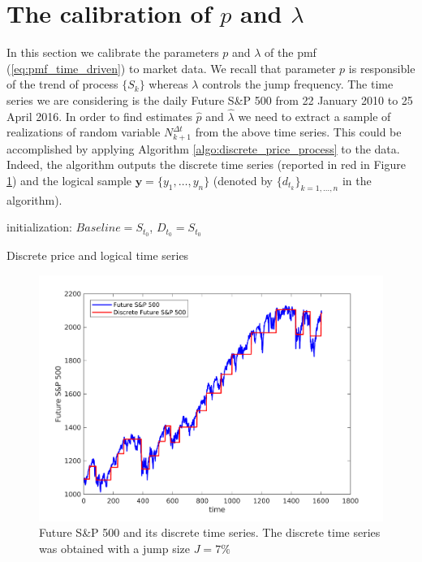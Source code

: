 \section{The calibration of $p$ and $\lambda$}
In this section we calibrate the parameters $p$ and $\lambda$ of the pmf (\ref{eq:pmf_time_driven}) to market data. We recall that parameter $p$ is responsible of the trend of process $\{S_k\}$ whereas $\lambda$ controls the jump frequency. The time series we are considering is the daily Future S\&P 500 from 22 January 2010 to 25 April 2016. In order to find estimates $\widehat{p}$ and $\widehat{\lambda}$ we need to extract a sample of realizations of random variable $N_{k+1}^{\Delta t}$ from the above time series. This could be accomplished by applying Algorithm \ref{algo:discrete_price_process} to the data. Indeed,  the algorithm outputs the discrete time series (reported in red in Figure \ref{fig:DiscreteDynamics}) and the logical sample $\bm{y}=\{y_1,\ldots,y_n\}$ (denoted by $\{d_{t_k}\}_{k=1,\ldots,n}$ in the algorithm).
\begin{algorithm}[H]
	\SetAlgoLined
	initialization: $Baseline = S_{t_0}$, $D_{t_0}=S_{t_0}$\;
	
\caption{Discrete price and logical time series}
\label{algo:discrete_price_process}
\end{algorithm}
\begin{figure}
	\centering
	\includegraphics[scale = 0.7]{Images/DiscreteDynamics}
	\caption{Future S\&P 500 and its discrete time series. The discrete time series was obtained with a jump size $J=7\%$}
	\label{fig:DiscreteDynamics}
\end{figure}
